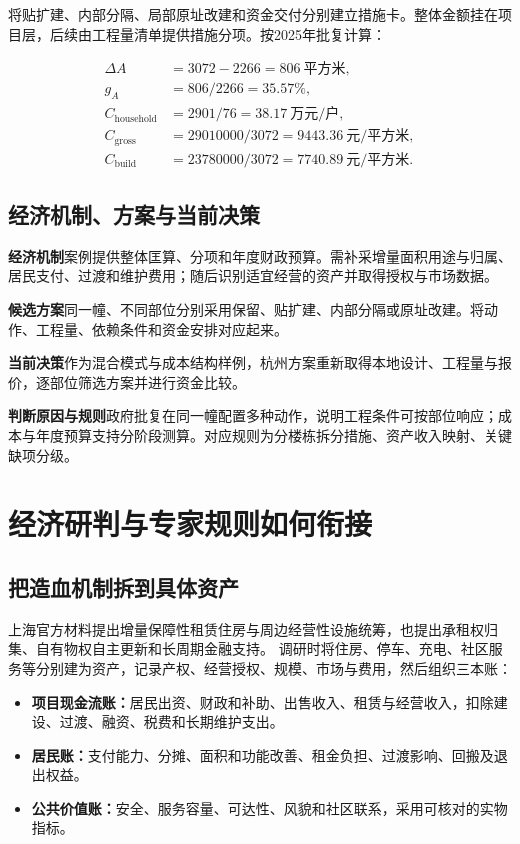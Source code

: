 \documentclass[UTF8,11pt,fontset=windows]{ctexart}
\newcommand{\field}[2]{\par\noindent\textbf{#1}\quad #2\par}
\begin{document}
将贴扩建、内部分隔、局部原址改建和资金交付分别建立措施卡。整体金额挂在项目层，后续由工程量清单提供措施分项。按2025年批复计算：

\begin{align*}
\Delta A &= 3072-2266=806\ \text{平方米},\\
g_A &= 806/2266=35.57\%,\\
C_{\mathrm{household}} &= 2901/76=38.17\ \text{万元/户},\\
C_{\mathrm{gross}} &= 29010000/3072=9443.36\ \text{元/平方米},\\
C_{\mathrm{build}} &= 23780000/3072=7740.89\ \text{元/平方米}.
\end{align*}

\subsection{经济机制、方案与当前决策}

\field{经济机制}{案例提供整体匡算、分项和年度财政预算。需补采增量面积用途与归属、居民支付、过渡和维护费用；随后识别适宜经营的资产并取得授权与市场数据。}
\field{候选方案}{同一幢、不同部位分别采用保留、贴扩建、内部分隔或原址改建。将动作、工程量、依赖条件和资金安排对应起来。}
\field{当前决策}{作为混合模式与成本结构样例，杭州方案重新取得本地设计、工程量与报价，逐部位筛选方案并进行资金比较。}
\field{判断原因与规则}{政府批复在同一幢配置多种动作，说明工程条件可按部位响应；成本与年度预算支持分阶段测算。对应规则为分楼栋拆分措施、资产收入映射、关键缺项分级。}

\clearpage
\section{经济研判与专家规则如何衔接}

\subsection{把造血机制拆到具体资产}

上海官方材料提出增量保障性租赁住房与周边经营性设施统筹，也提出承租权归集、自有物权自主更新和长周期金融支持。\cite{S10,S11} 调研时将住房、停车、充电、社区服务等分别建为资产，记录产权、经营授权、规模、市场与费用，然后组织三本账：

\begin{itemize}
\item \textbf{项目现金流账：}居民出资、财政和补助、出售收入、租赁与经营收入，扣除建设、过渡、融资、税费和长期维护支出。
\item \textbf{居民账：}支付能力、分摊、面积和功能改善、租金负担、过渡影响、回搬及退出权益。
\item \textbf{公共价值账：}安全、服务容量、可达性、风貌和社区联系，采用可核对的实物指标。
\end{itemize}
\end{document}

